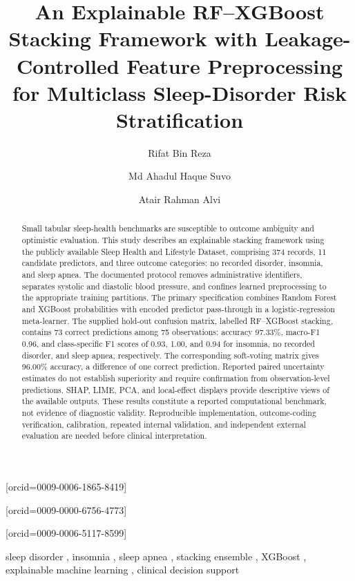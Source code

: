 \documentclass[a4paper,fleqn]{cas-dc}
\begin{document}
\raggedbottom
{}
\footmarks{}
\title[mode=title]{An Explainable RF--XGBoost Stacking Framework with Leakage-Controlled Feature Preprocessing for Multiclass Sleep-Disorder Risk Stratification}
\author[1]{Rifat Bin Reza}[orcid=0009-0006-1865-8419]
\cormark[1]
\author[2]{Md Ahadul Haque Suvo}[orcid=0009-0000-6756-4773]
\author[1]{Atair Rahman Alvi}[orcid=0009-0006-5117-8599]
\address[1]{BSRM School of Engineering, Department of Electrical and Electronics Engineering, Brac University, Dhaka, Bangladesh\label{affa}}
\address[2]{Aviation and Aerospace University, Department of Avionics Engineering, Dhaka, Bangladesh}
\begin{abstract}
Small tabular sleep-health benchmarks are susceptible to outcome ambiguity and optimistic evaluation. This study describes an explainable stacking framework using the publicly available Sleep Health and Lifestyle Dataset, comprising 374 records, 11 candidate predictors, and three outcome categories: no recorded disorder, insomnia, and sleep apnea. The documented protocol removes administrative identifiers, separates systolic and diastolic blood pressure, and confines learned preprocessing to the appropriate training partitions. The primary specification combines Random Forest and XGBoost probabilities with encoded predictor pass-through in a logistic-regression meta-learner. The supplied hold-out confusion matrix, labelled RF--XGBoost stacking, contains 73 correct predictions among 75 observations: accuracy 97.33\%, macro-F1 0.96, and class-specific F1 scores of 0.93, 1.00, and 0.94 for insomnia, no recorded disorder, and sleep apnea, respectively. The corresponding soft-voting matrix gives 96.00\% accuracy, a difference of one correct prediction. Reported paired uncertainty estimates do not establish superiority and require confirmation from observation-level predictions. SHAP, LIME, PCA, and local-effect displays provide descriptive views of the available outputs. These results constitute a reported computational benchmark, not evidence of diagnostic validity. Reproducible implementation, outcome-coding verification, calibration, repeated internal validation, and independent external evaluation are needed before clinical interpretation.
\end{abstract}
\begin{keywords}
sleep disorder \sep
insomnia \sep
sleep apnea \sep
stacking ensemble \sep
XGBoost \sep
explainable machine learning \sep
clinical decision support
\end{keywords}
\end{document}
